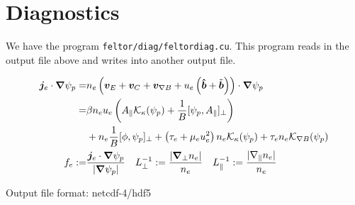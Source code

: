 \section{Diagnostics}\label{sec:diagnostics}
We have the program \texttt{feltor/diag/feltordiag.cu}.
This program reads in the output file above and writes into another output file.

\begin{align}
 {\boldsymbol{j}}_e\cdot {\boldsymbol{\nabla}}\psi_p =& n_e\left( {\boldsymbol{v}}_E + {\boldsymbol{v}}_C + {\boldsymbol{v}}_{\nabla
 B} + u_e \left(\bm{\hat{b}} + \tilde{{\boldsymbol{b}}}\right)\right) \cdot {\boldsymbol{\nabla}}\psi_p \nonumber\\
 =& \beta n_eu_e\left( A_\parallel \mathcal
 K_\kappa(\psi_p) + \frac{1}{B}[\psi_p, A_\parallel]_\perp\right) \nonumber\\
  &+ n_e\frac{1}{B}[\phi, \psi_p]_\perp + \left(\tau_e + \mu_e u_e^2\right)
   n_e\mathcal K_\kappa(\psi_p) + \tau_e n_e \mathcal K_{\nabla B}(\psi_p) \nonumber\\
   f_e :=& \frac{{\boldsymbol{j}}_e\cdot{\boldsymbol{\nabla}} \psi_p}{|{\boldsymbol{\nabla}}\psi_p|} \quad
   L_\perp^{-1} := \frac{|{\boldsymbol{\nabla}}_\perp n_e|}{n_e}\quad
   L_\parallel^{-1} := \frac{|\nabla_\parallel n_e|}{n_e}
\end{align}

Output file format: netcdf-4/hdf5

